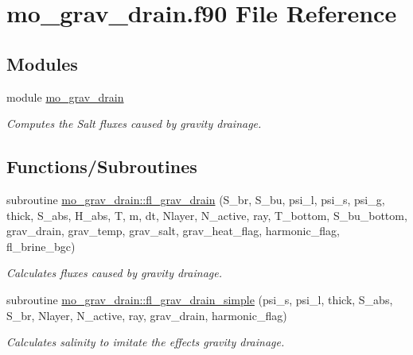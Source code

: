 \hypertarget{mo__grav__drain_8f90}{
\section{mo\_\-grav\_\-drain.f90 File Reference}
\label{mo__grav__drain_8f90}
}
\subsection*{Modules}
\begin{DoxyCompactItemize}
\item 
module \hyperlink{namespacemo__grav__drain}{mo\_\-grav\_\-drain}


\begin{DoxyCompactList}\small\item\em Computes the Salt fluxes caused by gravity drainage. \item\end{DoxyCompactList}

\end{DoxyCompactItemize}
\subsection*{Functions/Subroutines}
\begin{DoxyCompactItemize}
\item 
subroutine \hyperlink{namespacemo__grav__drain_a13446b857aa40114998fffc35b90489d}{mo\_\-grav\_\-drain::fl\_\-grav\_\-drain} (S\_\-br, S\_\-bu, psi\_\-l, psi\_\-s, psi\_\-g, thick, S\_\-abs, H\_\-abs, T, m, dt, Nlayer, N\_\-active, ray, T\_\-bottom, S\_\-bu\_\-bottom, grav\_\-drain, grav\_\-temp, grav\_\-salt, grav\_\-heat\_\-flag, harmonic\_\-flag, fl\_\-brine\_\-bgc)
\begin{DoxyCompactList}\small\item\em Calculates fluxes caused by gravity drainage. \item\end{DoxyCompactList}\item 
subroutine \hyperlink{namespacemo__grav__drain_acfbe9a1ea75d02f8e3e85a1f6aeb0ea3}{mo\_\-grav\_\-drain::fl\_\-grav\_\-drain\_\-simple} (psi\_\-s, psi\_\-l, thick, S\_\-abs, S\_\-br, Nlayer, N\_\-active, ray, grav\_\-drain, harmonic\_\-flag)
\begin{DoxyCompactList}\small\item\em Calculates salinity to imitate the effects gravity drainage. \item\end{DoxyCompactList}\end{DoxyCompactItemize}
